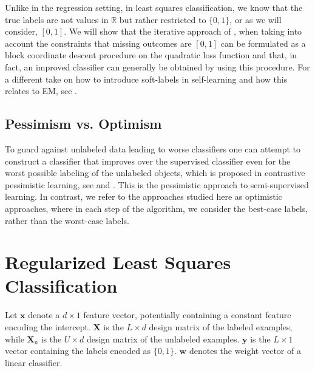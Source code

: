 \documentclass[conference,a4paper,10pt]{IEEEtran}\usepackage[]{graphicx}\usepackage[]{color}
\begin{document}

Unlike in the regression setting, in least squares classification, we know that the true labels are not values in $\mathbb{R}$ but rather restricted to $\{0,1\}$, or as we will consider, $[0,1]$. We will show that the iterative approach of \cite{Healy1956}, when taking into account the constraints that missing outcomes are $[0,1]$ can be formulated as a block coordinate descent procedure on the quadratic loss function and that, in fact, an improved classifier can generally be obtained by using this procedure. For a different take on how to introduce soft-labels in self-learning and how this relates to EM, see \cite{Mey2016}.

\subsection{Pessimism vs. Optimism}
To guard against unlabeled data leading to worse classifiers one can attempt to construct a classifier that improves over the supervised classifier even for the worst possible labeling of the unlabeled objects, which is proposed in contrastive pessimistic learning, see \cite{Loog2016} and \cite{Krijthe2015}. This is the pessimistic approach to semi-supervised learning. In contrast, we refer to the approaches studied here as optimistic approaches, where in each step of the algorithm, we consider the best-case labels, rather than the worst-case labels.

\section{Regularized Least Squares Classification}
Let $\mathbf{x}$ denote a $d\times 1$ feature vector, potentially containing a constant feature encoding the intercept.
$\mathbf{X}$ is the $L \times d$ design matrix of the labeled examples, while $\mathbf{X}_\text{u}$ is the  $U \times d$ design matrix of the unlabeled examples. $\mathbf{y}$ is the $L\times 1$ vector containing the labels encoded as $\{0,1\}$.
$\mathbf{w}$ denotes the weight vector of a linear classifier.
\end{document}
